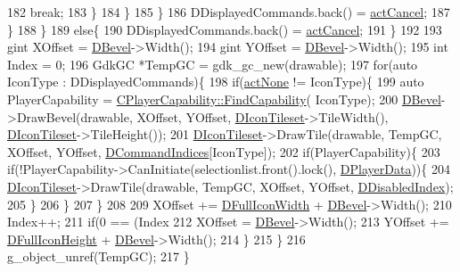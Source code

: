 \begin{DoxyCode}
182                         \textcolor{keywordflow}{break};   
183                     \}
184                 \}
185             \}
186             DDisplayedCommands.back() = \hyperlink{GameDataTypes_8h_a35b98ce26aca678b03c6f9f76e4778ceaec5e11ffc62be241b4f6673586b35a6b}{actCancel};
187         \}
188     \}
189     \textcolor{keywordflow}{else}\{
190         DDisplayedCommands.back() = \hyperlink{GameDataTypes_8h_a35b98ce26aca678b03c6f9f76e4778ceaec5e11ffc62be241b4f6673586b35a6b}{actCancel};
191     \}
192     
193     gint XOffset = \hyperlink{classCUnitActionRenderer_a3f4012557f7f4d71cfa02df725984ebb}{DBevel}->Width();
194     gint YOffset = \hyperlink{classCUnitActionRenderer_a3f4012557f7f4d71cfa02df725984ebb}{DBevel}->Width();
195     \textcolor{keywordtype}{int} Index = 0;
196     GdkGC *TempGC = gdk\_gc\_new(drawable);
197     \textcolor{keywordflow}{for}(\textcolor{keyword}{auto} IconType : DDisplayedCommands)\{
198         \textcolor{keywordflow}{if}(\hyperlink{GameDataTypes_8h_a35b98ce26aca678b03c6f9f76e4778ceaa8df154ad276f6f62054e9b5b0696f92}{actNone} != IconType)\{
199             \textcolor{keyword}{auto} PlayerCapability = \hyperlink{classCPlayerCapability_a881ba4b87385d7cfe5cb6ced2d26f226}{CPlayerCapability::FindCapability}(
      IconType);
200             \hyperlink{classCUnitActionRenderer_a3f4012557f7f4d71cfa02df725984ebb}{DBevel}->DrawBevel(drawable, XOffset, YOffset, \hyperlink{classCUnitActionRenderer_a3f5f7cf1840e1aa4b28ab507404a6b3a}{DIconTileset}->TileWidth(), 
      \hyperlink{classCUnitActionRenderer_a3f5f7cf1840e1aa4b28ab507404a6b3a}{DIconTileset}->TileHeight());   
201             \hyperlink{classCUnitActionRenderer_a3f5f7cf1840e1aa4b28ab507404a6b3a}{DIconTileset}->DrawTile(drawable, TempGC, XOffset, YOffset, 
      \hyperlink{classCUnitActionRenderer_a73eebe87330693c8546ea14c23672859}{DCommandIndices}[IconType]);
202             \textcolor{keywordflow}{if}(PlayerCapability)\{
203                 \textcolor{keywordflow}{if}(!PlayerCapability->CanInitiate(selectionlist.front().lock(), 
      \hyperlink{classCUnitActionRenderer_a77f8e3045992a48b27ad6e45d48a7b91}{DPlayerData}))\{
204                     \hyperlink{classCUnitActionRenderer_a3f5f7cf1840e1aa4b28ab507404a6b3a}{DIconTileset}->DrawTile(drawable, TempGC, XOffset, YOffset, 
      \hyperlink{classCUnitActionRenderer_abf505a324f367378f8c30ddd48bb6549}{DDisabledIndex});
205                 \}
206             \}
207         \}
208         
209         XOffset += \hyperlink{classCUnitActionRenderer_a67e5c1650ef8f849c05d9f059d12fb95}{DFullIconWidth} + \hyperlink{classCUnitActionRenderer_a3f4012557f7f4d71cfa02df725984ebb}{DBevel}->Width();
210         Index++;
211         \textcolor{keywordflow}{if}(0 == (Index %
212             XOffset = \hyperlink{classCUnitActionRenderer_a3f4012557f7f4d71cfa02df725984ebb}{DBevel}->Width();
213             YOffset += \hyperlink{classCUnitActionRenderer_a11b30763b92ed0cbfb842f86fe76fe26}{DFullIconHeight} + \hyperlink{classCUnitActionRenderer_a3f4012557f7f4d71cfa02df725984ebb}{DBevel}->Width();  
214         \}
215     \}
216     g\_object\_unref(TempGC);
217 \}
\end{DoxyCode}
